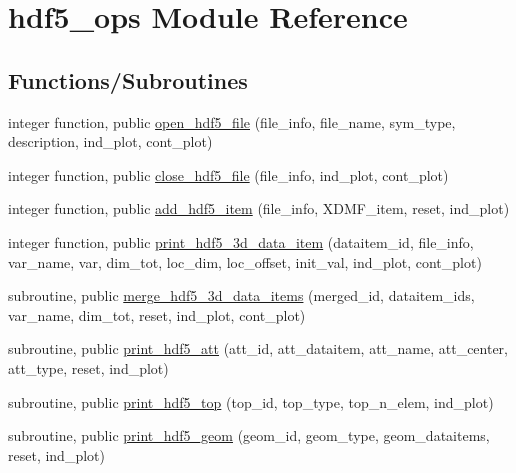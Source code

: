 \hypertarget{namespacehdf5__ops}{}\section{hdf5\+\_\+ops Module Reference}
\label{namespacehdf5__ops}
\subsection*{Functions/\+Subroutines}
\begin{DoxyCompactItemize}
\item 
integer function, public \hyperlink{namespacehdf5__ops_a28cdecb45d88592a69dada6fd5ab9919}{open\+\_\+hdf5\+\_\+file} (file\+\_\+info, file\+\_\+name, sym\+\_\+type, description, ind\+\_\+plot, cont\+\_\+plot)
\item 
integer function, public \hyperlink{namespacehdf5__ops_ad6c53fff55bd71f63470ca1e525ddb56}{close\+\_\+hdf5\+\_\+file} (file\+\_\+info, ind\+\_\+plot, cont\+\_\+plot)
\item 
integer function, public \hyperlink{namespacehdf5__ops_ade36dbd73b60da30e33a1059e590f734}{add\+\_\+hdf5\+\_\+item} (file\+\_\+info, X\+D\+M\+F\+\_\+item, reset, ind\+\_\+plot)
\item 
integer function, public \hyperlink{namespacehdf5__ops_ad794d069ca355f28536fba7e0d21bc13}{print\+\_\+hdf5\+\_\+3d\+\_\+data\+\_\+item} (dataitem\+\_\+id, file\+\_\+info, var\+\_\+name, var, dim\+\_\+tot, loc\+\_\+dim, loc\+\_\+offset, init\+\_\+val, ind\+\_\+plot, cont\+\_\+plot)
\item 
subroutine, public \hyperlink{namespacehdf5__ops_a7b18b66402089eef2288b2d532f6af5d}{merge\+\_\+hdf5\+\_\+3d\+\_\+data\+\_\+items} (merged\+\_\+id, dataitem\+\_\+ids, var\+\_\+name, dim\+\_\+tot, reset, ind\+\_\+plot, cont\+\_\+plot)
\item 
subroutine, public \hyperlink{namespacehdf5__ops_a4d0ba813f369f904a9e991804662d099}{print\+\_\+hdf5\+\_\+att} (att\+\_\+id, att\+\_\+dataitem, att\+\_\+name, att\+\_\+center, att\+\_\+type, reset, ind\+\_\+plot)
\item 
subroutine, public \hyperlink{namespacehdf5__ops_af34b4aea64a8b67ec827aaf4a7425caf}{print\+\_\+hdf5\+\_\+top} (top\+\_\+id, top\+\_\+type, top\+\_\+n\+\_\+elem, ind\+\_\+plot)
\item 
subroutine, public \hyperlink{namespacehdf5__ops_ac23a71e7029f46e5f38a95468fc10e22}{print\+\_\+hdf5\+\_\+geom} (geom\+\_\+id, geom\+\_\+type, geom\+\_\+dataitems, reset, ind\+\_\+plot)
\item 

\end{DoxyCompactItemize}
